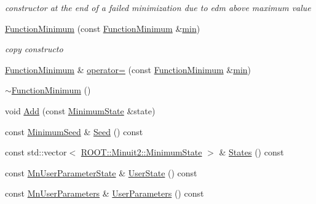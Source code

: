 \begin{DoxyCompactItemize}
\begin{DoxyCompactList}\small\item\em constructor at the end of a failed minimization due to edm above maximum value \end{DoxyCompactList}\item 
\mbox{\hyperlink{classROOT_1_1Minuit2_1_1FunctionMinimum_a79c734eb76f50e7638255095bd0670aa}{Function\+Minimum}} (const \mbox{\hyperlink{classROOT_1_1Minuit2_1_1FunctionMinimum}{Function\+Minimum}} \&\mbox{\hyperlink{SU3__internal_8h_ab0f5fed3171eb00d1c5f037d9f518a23}{min}})
\begin{DoxyCompactList}\small\item\em copy constructo \end{DoxyCompactList}\item 
\mbox{\hyperlink{classROOT_1_1Minuit2_1_1FunctionMinimum}{Function\+Minimum}} \& \mbox{\hyperlink{classROOT_1_1Minuit2_1_1FunctionMinimum_a107909f1a994436795eb310f951f14cb}{operator=}} (const \mbox{\hyperlink{classROOT_1_1Minuit2_1_1FunctionMinimum}{Function\+Minimum}} \&\mbox{\hyperlink{SU3__internal_8h_ab0f5fed3171eb00d1c5f037d9f518a23}{min}})
\item 
\mbox{\hyperlink{classROOT_1_1Minuit2_1_1FunctionMinimum_aaaef452fc02a74a63a9390329ed1dd04}{$\sim$\+Function\+Minimum}} ()
\item 
void \mbox{\hyperlink{classROOT_1_1Minuit2_1_1FunctionMinimum_a13b69e2d431d568f4485eb8b79d6c781}{Add}} (const \mbox{\hyperlink{classROOT_1_1Minuit2_1_1MinimumState}{Minimum\+State}} \&state)
\item 
const \mbox{\hyperlink{classROOT_1_1Minuit2_1_1MinimumSeed}{Minimum\+Seed}} \& \mbox{\hyperlink{classROOT_1_1Minuit2_1_1FunctionMinimum_a9812689b192b202a73ce1178e8098705}{Seed}} () const
\item 
const std\+::vector$<$ \mbox{\hyperlink{classROOT_1_1Minuit2_1_1MinimumState}{R\+O\+O\+T\+::\+Minuit2\+::\+Minimum\+State}} $>$ \& \mbox{\hyperlink{classROOT_1_1Minuit2_1_1FunctionMinimum_a5f08def4f7ca92700393d42ded6eb237}{States}} () const
\item 
const \mbox{\hyperlink{classROOT_1_1Minuit2_1_1MnUserParameterState}{Mn\+User\+Parameter\+State}} \& \mbox{\hyperlink{classROOT_1_1Minuit2_1_1FunctionMinimum_a698dc320ec24e2288f391f160ef8213e}{User\+State}} () const
\item 
const \mbox{\hyperlink{classROOT_1_1Minuit2_1_1MnUserParameters}{Mn\+User\+Parameters}} \& \mbox{\hyperlink{classROOT_1_1Minuit2_1_1FunctionMinimum_ac916253d7e29de7da4da5bf4b84a2ad5}{User\+Parameters}} () const

\end{DoxyCompactItemize}
